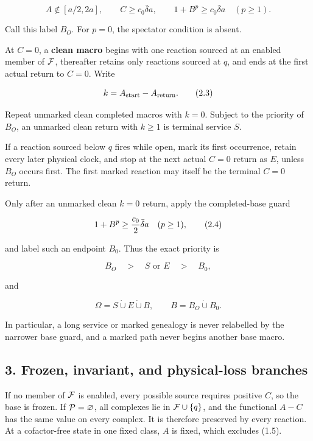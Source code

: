 \[
 A\notin[a/2,2a],\qquad
 C\ge c_0\bar\delta a,\qquad
 1+B^p\ge c_0\bar\delta a\quad(p\ge1).                     \tag{2.2}
\]

Call this label \(B_O\). For \(p=0\), the spectator condition is absent.

At \(C=0\), a \textbf{clean macro} begins with one reaction sourced at
an enabled member of \({\cal F}\), thereafter retains only reactions
sourced at \(q\), and ends at the first actual return to \(C=0\). Write

\[
                    k=A_{\rm start}-A_{\rm return}.         \tag{2.3}
\]

Repeat unmarked clean completed macros with \(k=0\). Subject to the
priority of \(B_O\), an unmarked clean return with \(k\ge1\) is terminal
service \(S\).

If a reaction sourced below \(q\) fires while open, mark its first
occurrence, retain every later physical clock, and stop at the next
actual \(C=0\) return as \(E\), unless \(B_O\) occurs first. The first
marked reaction may itself be the terminal \(C=0\) return.

Only after an unmarked clean \(k=0\) return, apply the completed-base
guard

\[
                 1+B^p\ge {c_0\over2}\bar\delta a
                 \quad(p\ge1),                             \tag{2.4}
\]

and label such an endpoint \(B_0\). Thus the exact priority is

\[
                    B_O\quad>\quad S\text{ or }E
                         \quad>\quad B_0,                   \tag{2.5}
\]

and

\[
                       \Omega=S\mathbin{\dot\cup}E
                                  \mathbin{\dot\cup}B,
 \qquad B=B_O\mathbin{\dot\cup}B_0.                        \tag{2.6}
\]

In particular, a long service or marked genealogy is never relabelled by
the narrower base guard, and a marked path never begins another base
macro.

\subsection{3. Frozen, invariant, and physical-loss
branches}

If no member of \({\cal F}\) is enabled, every possible source requires
positive \(C\), so the base is frozen. If \({\cal P}=\varnothing\), all
complexes lie in \({\cal F}\cup\{q\}\), and the functional \(A-C\) has
the same value on every complex. It is therefore preserved by every
reaction. At a cofactor-free state in one fixed class, \(A\) is fixed,
which excludes (1.5).


